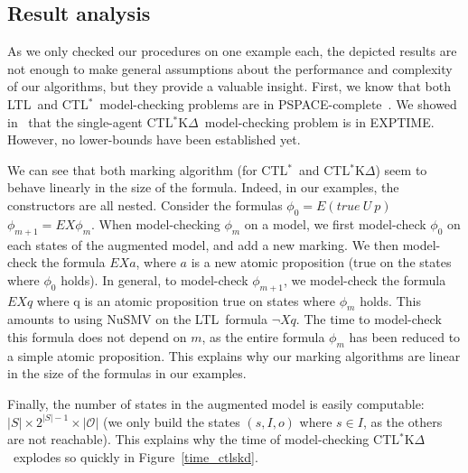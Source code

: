 \documentclass[dvipsnames]{acmart}
\def\ctls{CTL$^{*}$}
\def\ctlskd{CTL$^{*}$K$\Delta$}
\def\ltl{LTL}
\def\E{\mathit{E}}
\def\U{\mathit{U}}
\def\X{\mathit{X}}
\begin{document}
\subsection{Result analysis}
As we only checked our procedures on one example each, the depicted results are not enough to make general assumptions about the performance and complexity of our algorithms, but they provide a valuable insight.
First, we know that both \ltl\ and \ctls\ model-checking problems are in PSPACE-complete~\cite{complexity}. We showed in~\cite{KR18} that the single-agent \ctlskd\ model-checking problem is in EXPTIME. However, no lower-bounds have been established yet.

We can see that both marking algorithm (for \ctls\ and \ctlskd) seem to behave linearly in the size of the formula.
Indeed, in our examples, the constructors are all nested.
Consider the formulas $\phi_0 = \E(true~\U~p)$\quad$\phi_{m+1} = \E\X\phi_m$.
When model-checking $\phi_m$ on a model, we first model-check $\phi_0$ on each states of the augmented model, and add a new marking.
We then model-check the formula $\E\X a$, where $a$ is a new atomic proposition (true on the states where $\phi_0$ holds).
In general, to model-check $\phi_{m+1}$, we model-check the formula $\E\X q$ where q is an atomic proposition true on states where $\phi_m$ holds.
This amounts to using NuSMV on the \ltl\ formula $\neg\X q$.
The time to model-check this formula does not depend on $m$, as the entire formula $\phi_m$ has been reduced to a simple atomic proposition.
This explains why our marking algorithms are linear in the size of the formulas in our examples.

Finally, the number of states in the augmented model is easily computable: $|S|\times 2^{|S|-1}\times |\mathcal{O}|$ (we only build the states $(s,I,o)$ where $s\in I$, as the others are not reachable). This explains why the time of model-checking \ctlskd\ explodes so quickly in Figure~\ref{time_ctlskd}.
\end{document}
